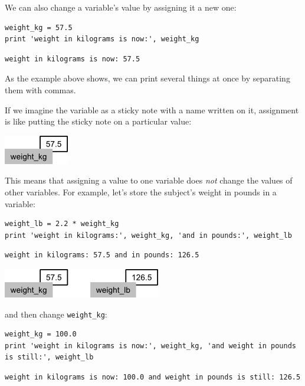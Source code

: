 \documentclass[]{book}
\begin{document}
We can also change a variable's value by assigning it a new one:

\begin{verbatim}
weight_kg = 57.5
print 'weight in kilograms is now:', weight_kg
\end{verbatim}

\begin{verbatim}
weight in kilograms is now: 57.5
\end{verbatim}

As the example above shows, we can print several things at once by
separating them with commas.

If we imagine the variable as a sticky note with a name written on it,
assignment is like putting the sticky note on a particular value:

\includegraphics{novice/python/img/python-sticky-note-variables-01.png}

This means that assigning a value to one variable does \emph{not} change
the values of other variables. For example, let's store the subject's
weight in pounds in a variable:

\begin{verbatim}
weight_lb = 2.2 * weight_kg
print 'weight in kilograms:', weight_kg, 'and in pounds:', weight_lb
\end{verbatim}

\begin{verbatim}
weight in kilograms: 57.5 and in pounds: 126.5
\end{verbatim}

\includegraphics{novice/python/img/python-sticky-note-variables-02.png}

and then change \texttt{weight\_kg}:

\begin{verbatim}
weight_kg = 100.0
print 'weight in kilograms is now:', weight_kg, 'and weight in pounds is still:', weight_lb
\end{verbatim}

\begin{verbatim}
weight in kilograms is now: 100.0 and weight in pounds is still: 126.5
\end{verbatim}
\end{document}
